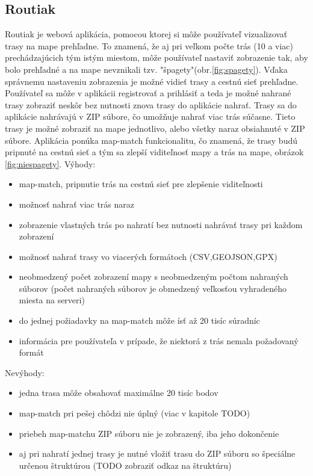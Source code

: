 \subsection{Routiak}
Routiak je webová aplikácia, pomocou ktorej si môže používateľ vizualizovať trasy na mape prehľadne. To znamená, že aj pri veľkom počte trás (10 a viac) prechádzajúcich tým istým miestom, môže používateľ nastaviť zobrazenie tak, aby bolo prehľadné a na mape nevznikali tzv. "špagety"(obr.\ref{fig:spagety}). Vďaka správnemu nastaveniu zobrazenia je možné vidieť trasy a cestnú sieť prehľadne. Používateľ sa môže v aplikácii registrovať a prihlásiť a teda je možné nahrané trasy zobraziť neskôr bez nutnosti znova trasy do aplikácie nahrať. Trasy sa do aplikácie nahrávajú v ZIP súbore, čo umožňuje nahrať viac trás súčasne. Tieto trasy je možné zobraziť na mape jednotlivo, alebo všetky naraz obsiahnuté v ZIP súbore. Aplikácia ponúka map-match funkcionalitu, čo znamená, že trasy budú pripnuté na cestnú sieť a tým sa zlepší viditeľnosť mapy a trás na mape, obrázok \ref{fig:niespagety}. 
\newline Výhody:
\begin{itemize}
  \item map-match, pripnutie trás na cestnú sieť pre zlepšenie viditeľnosti
  \item možnosť nahrať viac trás naraz
  \item zobrazenie vlastných trás po nahratí bez nutnosti nahrávať trasy pri každom zobrazení
  \item možnosť nahrať trasy vo viacerých formátoch (CSV,GEOJSON,GPX)
  \item neobmedzený počet zobrazení mapy s neobmedzeným počtom nahraných súborov (počet nahraných súborov je obmedzený veľkosťou vyhradeného miesta na serveri)
  \item do jednej požiadavky na map-match môže ísť až 20 tisíc súradníc
  \item informácia pre používateľa v prípade, že niektorá z trás nemala požadovaný formát 
\end{itemize}
Nevýhody:
\begin{itemize}
  \item jedna trasa môže obsahovať maximálne 20 tisíc bodov
  \item map-match pri pešej chôdzi nie úplný (viac v kapitole TODO)
  \item priebeh map-matchu ZIP súboru nie je zobrazený, iba jeho dokončenie
  \item aj pri nahratí jednej trasy je nutné vložiť trasu do ZIP súboru so špeciálne určenou štruktúrou (TODO zobraziť odkaz na štruktúru)
\end{itemize}
